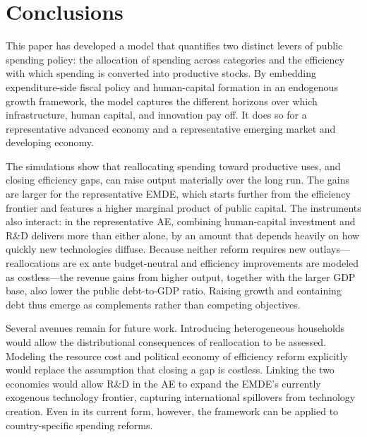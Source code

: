 \documentclass[a4paper,11pt]{article}
\begin{document}
\section{Conclusions} \label{sec:conclusions}

This paper has developed a model that quantifies two distinct levers of public spending policy: the allocation of spending across categories and the efficiency with which spending is converted into productive stocks.
By embedding expenditure-side fiscal policy and human-capital formation in an endogenous growth framework, the model captures the different horizons over which infrastructure, human capital, and innovation pay off.
It does so for a representative advanced economy and a representative emerging market and developing economy.

The simulations show that reallocating spending toward productive uses, and closing efficiency gaps, can raise output materially over the long run.
The gains are larger for the representative EMDE, which starts further from the efficiency frontier and features a higher marginal product of public capital.
The instruments also interact: in the representative AE, combining human-capital investment and R\&D delivers more than either alone, by an amount that depends heavily on how quickly new technologies diffuse.
Because neither reform requires new outlays---reallocations are ex ante budget-neutral and efficiency improvements are modeled as costless---the revenue gains from higher output, together with the larger GDP base, also lower the public debt-to-GDP ratio.
Raising growth and containing debt thus emerge as complements rather than competing objectives.

Several avenues remain for future work.
Introducing heterogeneous households would allow the distributional consequences of reallocation to be assessed.
Modeling the resource cost and political economy of efficiency reform explicitly would replace the assumption that closing a gap is costless.
Linking the two economies would allow R\&D in the AE to expand the EMDE's currently exogenous technology frontier, capturing international spillovers from technology creation.
Even in its current form, however, the framework can be applied to country-specific spending reforms.



\end{document}
